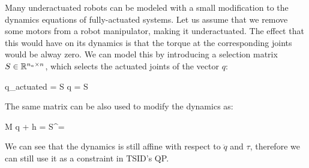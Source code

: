 Many underactuated robots can be modeled with a small modification to the dynamics equations of fully-actuated systems.
Let us assume that we remove some motors from a robot manipulator, making it underactuated. 
The effect that this would have on its dynamics is that the torque at the corresponding joints would be alway zero. 
We can model this by introducing a selection matrix $S \in \mathbb{R}^{n_a\times n}$, which selects the actuated joints of the vector $q$:
\begin{eqs}{}
q_{actuated} = S q = S 
\end{eqs}
The same matrix can be also used to modify the dynamics as:
\begin{eqs}{}
M \ddot q + h = S^\T \tau = 
\end{eqs}
We can see that the dynamics is still affine with respect to $\ddot q$ and $\tau$, therefore we can still use it as a constraint in TSID's QP.


